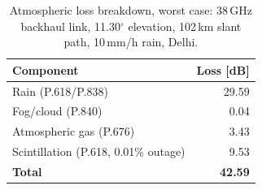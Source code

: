 \begin{table}[h!]
\centering
\small
\begin{tabular}{lr}
\hline
\textbf{Component} & \textbf{Loss [dB]} \\
\hline
Rain (P.618/P.838) & 29.59 \\
Fog/cloud (P.840) & 0.04 \\
Atmospheric gas (P.676) & 3.43 \\
Scintillation (P.618, 0.01\% outage) & 9.53 \\
\hline
\textbf{Total} & \textbf{42.59} \\
\hline
\end{tabular}
\caption{Atmospheric loss breakdown, worst case: 38\,GHz backhaul link, 11.30$^\circ$ elevation, 102\,km slant path, 10\,mm/h rain, Delhi.}
\label{tab:atm_losses_worstcase}
\end{table}

